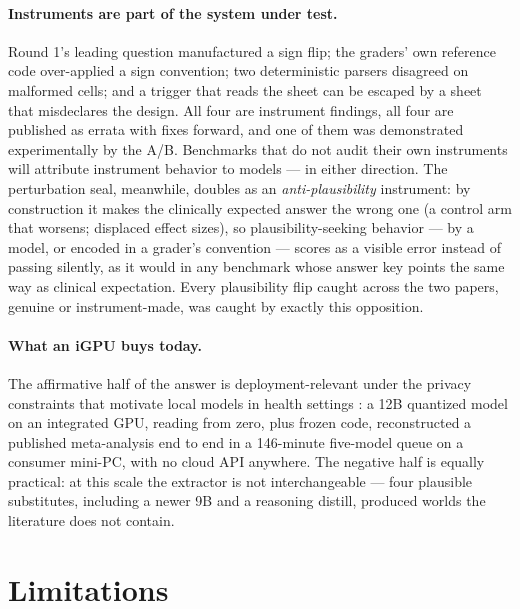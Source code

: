 \documentclass[11pt]{article}
\begin{document}
\paragraph{Instruments are part of the system under test.} Round 1's leading question manufactured a sign flip; the graders' own reference code over-applied a sign convention; two deterministic parsers disagreed on malformed cells; and a trigger that reads the sheet can be escaped by a sheet that misdeclares the design. All four are instrument findings, all four are published as errata with fixes forward, and one of them was demonstrated experimentally by the A/B. Benchmarks that do not audit their own instruments will attribute instrument behavior to models --- in either direction. The perturbation seal, meanwhile, doubles as an \emph{anti-plausibility} instrument: by construction it makes the clinically expected answer the wrong one (a control arm that worsens; displaced effect sizes), so plausibility-seeking behavior --- by a model, or encoded in a grader's convention --- scores as a visible error instead of passing silently, as it would in any benchmark whose answer key points the same way as clinical expectation. Every plausibility flip caught across the two papers, genuine or instrument-made, was caught by exactly this opposition.

\paragraph{What an iGPU buys today.} The affirmative half of the answer is deployment-relevant under the privacy constraints that motivate local models in health settings \citep{wiest2024privacy,spaanderman2025openweight,flemyng2025position}: a 12B quantized model on an integrated GPU, reading from zero, plus frozen code, reconstructed a published meta-analysis end to end in a 146-minute five-model queue on a consumer mini-PC, with no cloud API anywhere. The negative half is equally practical: at this scale the extractor is not interchangeable --- four plausible substitutes, including a newer 9B and a reasoning distill, produced worlds the literature does not contain.

\section{Limitations}
\end{document}
